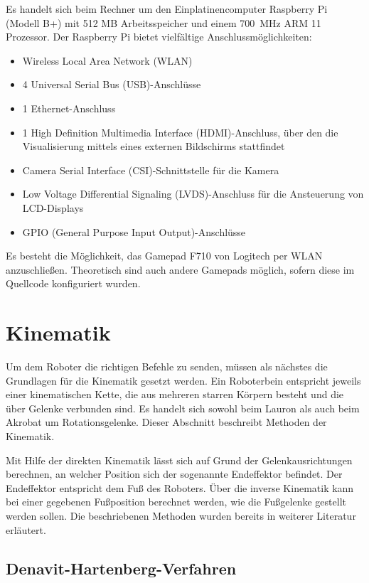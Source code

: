 Es handelt sich beim Rechner um den Einplatinencomputer Raspberry Pi (Modell B+) mit 512 MB Arbeitsspeicher und einem \SI{700}{MHz} ARM 11 Prozessor. Der Raspberry Pi bietet vielfältige Anschlussmöglichkeiten:
\begin{itemize}
\item Wireless Local Area Network (WLAN)
\item 4 Universal Serial Bus (USB)-Anschlüsse
\item 1 Ethernet-Anschluss
\item 1 High Definition Multimedia Interface (HDMI)-Anschluss, über den die Visualisierung mittels eines externen Bildschirms stattfindet
\item Camera Serial Interface (CSI)-Schnittstelle für die Kamera
\item Low Voltage Differential Signaling (LVDS)-Anschluss für die Ansteuerung von LCD-Displays
\item GPIO (General Purpose Input Output)-Anschlüsse
\end{itemize}

Es besteht die Möglichkeit, das Gamepad F710 von Logitech per WLAN anzuschließen. Theoretisch sind auch andere Gamepads möglich, sofern diese im Quellcode konfiguriert wurden. \autocite{askerow2014}

\section{Kinematik}

Um dem Roboter die richtigen Befehle zu senden, müssen als nächstes die Grundlagen für die Kinematik gesetzt werden. Ein Roboterbein entspricht jeweils einer kinematischen Kette, die aus mehreren starren Körpern besteht und die über Gelenke verbunden sind. Es handelt sich sowohl beim Lauron als auch beim Akrobat um Rotationsgelenke. Dieser Abschnitt beschreibt Methoden der Kinematik.

Mit Hilfe der direkten Kinematik lässt sich auf Grund der Gelenkausrichtungen berechnen, an welcher Position sich der sogenannte Endeffektor befindet. Der Endeffektor entspricht dem Fuß des Roboters. Über die inverse Kinematik kann bei einer gegebenen Fußposition berechnet werden, wie die Fußgelenke gestellt werden sollen. Die beschriebenen Methoden wurden bereits in weiterer Literatur erläutert. \autocite{den55} \autocite{wloka92} \autocite{ihme02} \autocite{fellmann2007}

\subsection{Denavit-Hartenberg-Verfahren}

